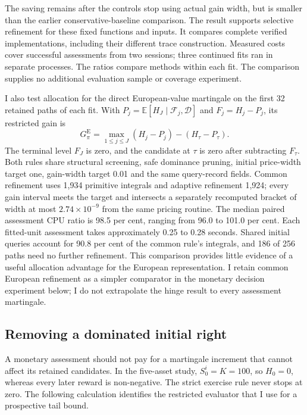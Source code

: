 \documentclass[11pt]{article}
\newcommand{\E}{\mathbb E}
\newcommand{\F}{\mathcal F}
\begin{document}
The saving remains after the controls stop using actual gain width, but is smaller than the earlier conservative-baseline comparison. The result supports selective refinement for these fixed functions and inputs. It compares complete verified implementations, including their different trace construction. Measured costs cover successful assessments from two sessions; three continued fits ran in separate processes. The ratios compare methods within each fit. The comparison supplies no additional evaluation sample or coverage experiment.

I also test allocation for the direct European-value martingale on the first 32 retained paths of each fit. With $P_j=\E[H_J\mid\F_j,\mathcal D]$ and $F_j=H_j-P_j$, its restricted gain is
\begin{equation}
G^{\mathrm E}_\pi=\max_{1\leq j\leq J}(H_j-P_j)-(H_\tau-P_\tau).
\label{eq:european-restricted-gain}
\end{equation}
The terminal level $F_J$ is zero, and the candidate at $\tau$ is zero after subtracting $F_\tau$. Both rules share structural screening, safe dominance pruning, initial price-width target one, gain-width target 0.01 and the same query-record fields. Common refinement uses 1,934 primitive integrals and adaptive refinement 1,924; every gain interval meets the target and intersects a separately recomputed bracket of width at most $2.74\times10^{-9}$ from the same pricing routine. The median paired assessment CPU ratio is 98.5 per cent, ranging from 96.0 to 101.0 per cent. Each fitted-unit assessment takes approximately 0.25 to 0.28 seconds. Shared initial queries account for 90.8 per cent of the common rule's integrals, and 186 of 256 paths need no further refinement. This comparison provides little evidence of a useful allocation advantage for the European representation. I retain common European refinement as a simpler comparator in the monetary decision experiment below; I do not extrapolate the hinge result to every assessment martingale.


\subsection{Removing a dominated initial right}
\label{sec:restricted-right}

A monetary assessment should not pay for a martingale increment that cannot affect its retained candidates. In the five-asset study, $S^i_0=K=100$, so $H_0=0$, whereas every later reward is non-negative. The strict exercise rule never stops at zero. The following calculation identifies the restricted evaluator that I use for a prospective tail bound.
\end{document}

